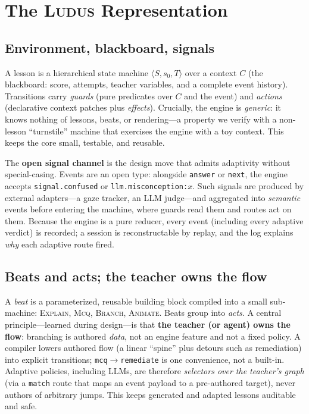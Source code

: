 \documentclass[sigconf,review,anonymous]{acmart}
\newcommand{\sys}{\textsc{Ludus}\xspace}
\begin{document}
\section{The \sys{} Representation}
\label{sec:rep}

\subsection{Environment, blackboard, signals}
A lesson is a hierarchical state machine $\langle S, s_0, T\rangle$ over a
context $C$ (the blackboard: score, attempts, teacher variables, and a complete
event history). Transitions carry \emph{guards} (pure predicates over $C$ and the
event) and \emph{actions} (declarative context patches plus \emph{effects}).
Crucially, the engine is \emph{generic}: it knows nothing of lessons, beats, or
rendering---a property we verify with a non-lesson ``turnstile'' machine that
exercises the engine with a toy context. This keeps the core small, testable,
and reusable.

The \textbf{open signal channel} is the design move that admits adaptivity
without special-casing. Events are an open type: alongside
\texttt{answer} or \texttt{next}, the engine accepts \texttt{signal.confused} or
\texttt{llm.misconception:$x$}. Such signals are produced by external
adapters---a gaze tracker, an LLM judge---and aggregated into \emph{semantic}
events before entering the machine, where guards read them and routes act on
them. Because the engine is a pure reducer, every event (including every
adaptive verdict) is recorded; a session is reconstructable by replay, and the
log explains \emph{why} each adaptive route fired.

\subsection{Beats and acts; the teacher owns the flow}
A \emph{beat} is a parameterized, reusable building block compiled into a small
sub-machine: \textsc{Explain}, \textsc{Mcq}, \textsc{Branch}, \textsc{Animate}.
Beats group into \emph{acts}. A central principle---learned during design---is
that \textbf{the teacher (or agent) owns the flow}: branching is authored
\emph{data}, not an engine feature and not a fixed policy. A compiler lowers
authored flow (a linear ``spine'' plus detours such as remediation) into
explicit transitions; \texttt{mcq$\to$remediate} is one convenience, not a
built-in. Adaptive policies, including LLMs, are therefore \emph{selectors over
the teacher's graph} (via a \texttt{match} route that maps an event payload to a
pre-authored target), never authors of arbitrary jumps. This keeps generated and
adapted lessons auditable and safe.
\end{document}
